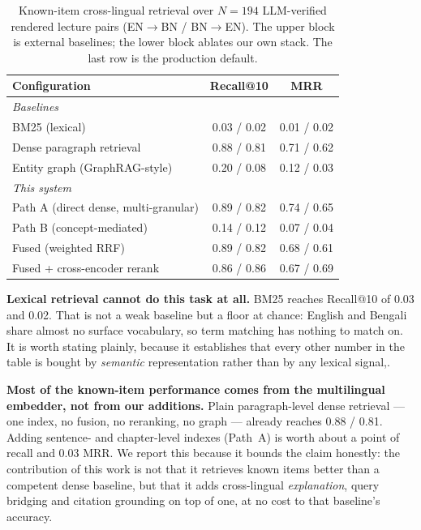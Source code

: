 \documentclass[pdflatex,sn-mathphys-num]{sn-jnl}
\begin{document}
\begin{table}[t]
\centering
\caption{Known-item cross-lingual retrieval over $N=194$ LLM-verified
rendered lecture pairs (EN$\to$BN / BN$\to$EN). The upper block is external
baselines; the lower block ablates our own stack. The last row is the
production default.}
\label{tab:knownitem}
\begin{tabular}{lcc}
\toprule
Configuration & Recall@10 & MRR\\
\midrule
\multicolumn{3}{l}{\emph{Baselines}}\\
BM25 (lexical)                     & 0.03 / 0.02 & 0.01 / 0.02\\
Dense paragraph retrieval          & 0.88 / 0.81 & 0.71 / 0.62\\
Entity graph (GraphRAG-style)      & 0.20 / 0.08 & 0.12 / 0.03\\
\midrule
\multicolumn{3}{l}{\emph{This system}}\\
Path A (direct dense, multi-granular) & 0.89 / 0.82 & 0.74 / 0.65\\
Path B (concept-mediated)          & 0.14 / 0.12 & 0.07 / 0.04\\
Fused (weighted RRF)               & 0.89 / 0.82 & 0.68 / 0.61\\
Fused + cross-encoder rerank       & 0.86 / 0.86 & 0.67 / 0.69\\
\bottomrule
\end{tabular}
\end{table}

\textbf{Lexical retrieval cannot do this task at all.} BM25 reaches
Recall@10 of 0.03 and 0.02. That is not a weak baseline but a floor at
chance: English and Bengali share almost no surface vocabulary, so term
matching has nothing to match on. It is worth stating plainly, because it
establishes that every other number in the table is bought by
\emph{semantic} representation rather than by any lexical signal,.

\textbf{Most of the known-item performance comes from the multilingual
embedder, not from our additions.} Plain paragraph-level dense retrieval ---
one index, no fusion, no reranking, no graph --- already reaches 0.88 / 0.81.
Adding sentence- and chapter-level indexes (Path~A) is worth about a point
of recall and 0.03 MRR. We report this because it bounds the claim honestly:
the contribution of this work is not that it retrieves known items better
than a competent dense baseline, but that it adds cross-lingual
\emph{explanation}, query bridging and citation grounding on top of one, at
no cost to that baseline's accuracy.
\end{document}
